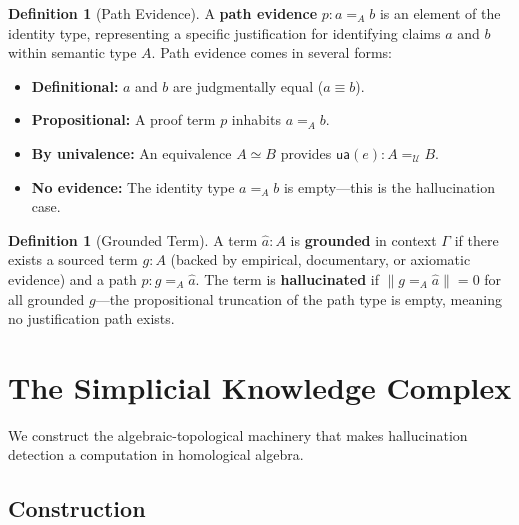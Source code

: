 \documentclass[11pt,a4paper]{article}
\theoremstyle{plain}
\theoremstyle{definition}
\newtheorem{definition}[theorem]{Definition}
\newcommand{\ua}{\mathsf{ua}}
\begin{document}
\begin{definition}[Path Evidence]\label{def:pathev}
A \textbf{path evidence} $p : a =_A b$ is an element of the identity type, representing a specific justification for identifying claims $a$ and $b$ within semantic type $A$. Path evidence comes in several forms:
\begin{itemize}[nosep]
  \item \textbf{Definitional:} $a$ and $b$ are judgmentally equal ($a \equiv b$).
  \item \textbf{Propositional:} A proof term $p$ inhabits $a =_A b$.
  \item \textbf{By univalence:} An equivalence $A \simeq B$ provides $\ua(e) : A =_{\mathcal{U}} B$.
  \item \textbf{No evidence:} The identity type $a =_A b$ is empty---this is the hallucination case.
\end{itemize}
\end{definition}

\begin{definition}[Grounded Term]\label{def:grounded}
A term $\hat{a} : A$ is \textbf{grounded} in context $\Gamma$ if there exists a sourced term $g : A$ (backed by empirical, documentary, or axiomatic evidence) and a path $p : g =_A \hat{a}$. The term is \textbf{hallucinated} if $\| g =_A \hat{a} \| = 0$ for all grounded $g$---the propositional truncation of the path type is empty, meaning no justification path exists.
\end{definition}

\section{The Simplicial Knowledge Complex}\label{sec:simplicial}

We construct the algebraic-topological machinery that makes hallucination detection a computation in homological algebra.

\subsection{Construction}
\end{document}
